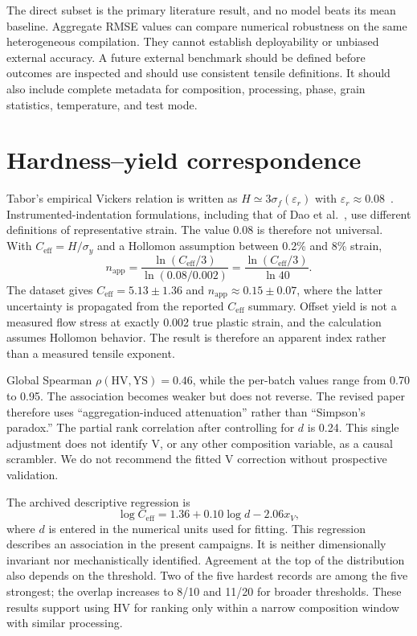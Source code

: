 \documentclass[a4paper,11pt]{article}
\begin{document}
The direct subset is the primary literature result, and no model beats its mean baseline. Aggregate RMSE values can compare numerical robustness on the same heterogeneous compilation. They cannot establish deployability or unbiased external accuracy. A future external benchmark should be defined before outcomes are inspected and should use consistent tensile definitions. It should also include complete metadata for composition, processing, phase, grain statistics, temperature, and test mode.

\section{Hardness--yield correspondence}
\label{si:tabor}

Tabor's empirical Vickers relation is written as $H\simeq3\sigma_f(\varepsilon_r)$ with $\varepsilon_r\approx0.08$~\cite{Tabor1951}. Instrumented-indentation formulations, including that of Dao et al.~\cite{Dao2001}, use different definitions of representative strain. The value 0.08 is therefore not universal. With $C_{\mathrm{eff}}=H/\sigma_y$ and a Hollomon assumption between 0.2\% and 8\% strain,
\begin{equation}
n_{\mathrm{app}}=\frac{\ln(C_{\mathrm{eff}}/3)}{\ln(0.08/0.002)}
=\frac{\ln(C_{\mathrm{eff}}/3)}{\ln 40}.
\end{equation}
The dataset gives $C_{\mathrm{eff}}=5.13\pm1.36$ and $n_{\mathrm{app}}\approx0.15\pm0.07$, where the latter uncertainty is propagated from the reported $C_{\mathrm{eff}}$ summary. Offset yield is not a measured flow stress at exactly 0.002 true plastic strain, and the calculation assumes Hollomon behavior. The result is therefore an apparent index rather than a measured tensile exponent.

Global Spearman $\rho(\mathrm{HV},\mathrm{YS})=0.46$, while the per-batch values range from 0.70 to 0.95. The association becomes weaker but does not reverse. The revised paper therefore uses ``aggregation-induced attenuation'' rather than ``Simpson's paradox.'' The partial rank correlation after controlling for $d$ is 0.24. This single adjustment does not identify V, or any other composition variable, as a causal scrambler. We do not recommend the fitted V correction without prospective validation.

The archived descriptive regression is
\begin{equation}
\log C_{\mathrm{eff}}=1.36+0.10\log d-2.06x_V,
\end{equation}
where $d$ is entered in the numerical units used for fitting. This regression describes an association in the present campaigns. It is neither dimensionally invariant nor mechanistically identified. Agreement at the top of the distribution also depends on the threshold. Two of the five hardest records are among the five strongest; the overlap increases to 8/10 and 11/20 for broader thresholds. These results support using HV for ranking only within a narrow composition window with similar processing.
\end{document}
